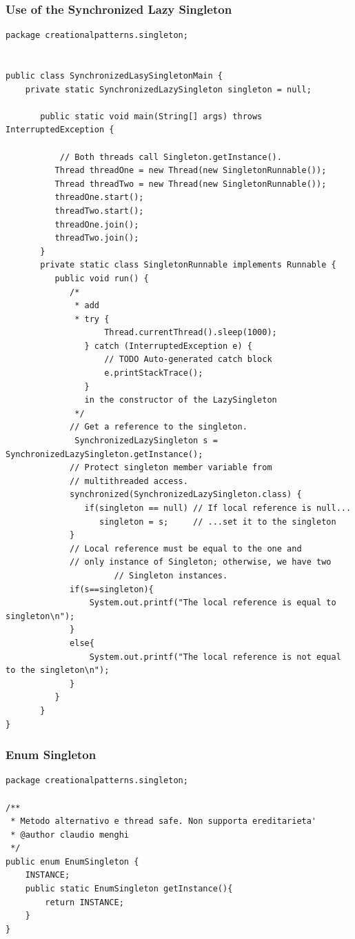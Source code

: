 \documentclass{article}
\begin{document}
\subsubsection{Use of the Synchronized Lazy Singleton}
\begin{lstlisting}
package creationalpatterns.singleton;


public class SynchronizedLasySingletonMain {
	private static SynchronizedLazySingleton singleton = null;
	
	   public static void main(String[] args) throws InterruptedException {
			
		   // Both threads call Singleton.getInstance().
	      Thread threadOne = new Thread(new SingletonRunnable());
	      Thread threadTwo = new Thread(new SingletonRunnable());
	      threadOne.start();
	      threadTwo.start();
	      threadOne.join();
	      threadTwo.join();
	   }
	   private static class SingletonRunnable implements Runnable {
	      public void run() {
	    	 /*
	    	  * add 
	    	  * try {
					Thread.currentThread().sleep(1000);
				} catch (InterruptedException e) {
					// TODO Auto-generated catch block
					e.printStackTrace();
				}
				in the constructor of the LazySingleton 
	    	  */
	         // Get a reference to the singleton.
	    	  SynchronizedLazySingleton s = SynchronizedLazySingleton.getInstance();
	         // Protect singleton member variable from
	         // multithreaded access.
	         synchronized(SynchronizedLazySingleton.class) {
	            if(singleton == null) // If local reference is null...
	               singleton = s;     // ...set it to the singleton
	         }
	         // Local reference must be equal to the one and
	         // only instance of Singleton; otherwise, we have two
	                  // Singleton instances.
	         if(s==singleton){
	        	 System.out.printf("The local reference is equal to singleton\n");
	         }
	         else{
	        	 System.out.printf("The local reference is not equal to the singleton\n");
	         }
	      }
	   }
}
\end{lstlisting}


\subsubsection{Enum Singleton}

\begin{lstlisting}
package creationalpatterns.singleton;

/**
 * Metodo alternativo e thread safe. Non supporta ereditarieta'
 * @author claudio menghi
 */
public enum EnumSingleton {
	INSTANCE;
	public static EnumSingleton getInstance(){
		return INSTANCE;
	}
}
\end{lstlisting}

\clearpage






\nocite{*}
\end{document}
